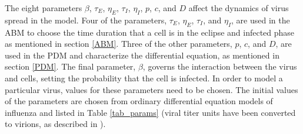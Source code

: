 The eight parameters $\beta$, $\tau_E$, $\eta_E$, $\tau_I$, $\eta_I$, $p$, $c$, and $D$ affect the dynamics of virus spread in the model. Four of the parameters, $\tau_E$, $\eta_E$, $\tau_I$, and $\eta_I$, are used in the ABM to choose the time duration that a cell is in the eclipse and infected phase as mentioned in section \ref{ABM}. Three of the other parameters, $p$, $c$, and $D$, are used in the PDM and characterize the differential equation, as mentioned in section \ref{PDM}. The final parameter, $\beta$, governs the interaction between the virus and cells, setting the probability that the cell is infected. In order to model a particular virus, values for these parameters need to be chosen. The initial values of the parameters are chosen from ordinary differential equation models of influenza and listed in Table \ref{tab_params} (viral titer units have been converted to virions, as described in \citep{dobrovolny17}). %

\begin{table}
\caption{Parameter values to simulate an influenza infection with the ABM/PDM model.\label{tab_params}}
\end{table}

